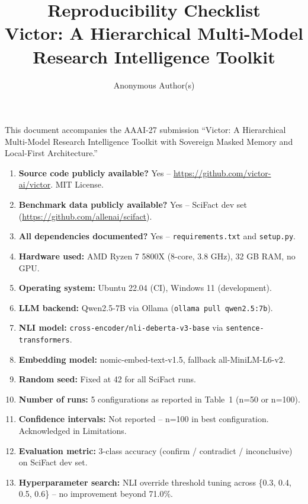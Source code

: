 \documentclass[letterpaper]{article}
\title{Reproducibility Checklist\\Victor: A Hierarchical Multi-Model Research Intelligence Toolkit}
\author{Anonymous Author(s)}
\begin{document}
\maketitle

This document accompanies the AAAI-27 submission ``Victor: A Hierarchical Multi-Model Research Intelligence Toolkit with Sovereign Masked Memory and Local-First Architecture.''

\begin{enumerate}
  \item \textbf{Source code publicly available?} Yes -- \url{https://github.com/victor-ai/victor}. MIT License.
  \item \textbf{Benchmark data publicly available?} Yes -- SciFact dev set (\url{https://github.com/allenai/scifact}).
  \item \textbf{All dependencies documented?} Yes -- \texttt{requirements.txt} and \texttt{setup.py}.
  \item \textbf{Hardware used:} AMD Ryzen 7 5800X (8-core, 3.8 GHz), 32 GB RAM, no GPU.
  \item \textbf{Operating system:} Ubuntu 22.04 (CI), Windows 11 (development).
  \item \textbf{LLM backend:} Qwen2.5-7B via Ollama (\texttt{ollama pull qwen2.5:7b}).
  \item \textbf{NLI model:} \texttt{cross-encoder/nli-deberta-v3-base} via \texttt{sentence-transformers}.
  \item \textbf{Embedding model:} nomic-embed-text-v1.5, fallback all-MiniLM-L6-v2.
  \item \textbf{Random seed:} Fixed at 42 for all SciFact runs.
  \item \textbf{Number of runs:} 5 configurations as reported in Table~1 (n=50 or n=100).
  \item \textbf{Confidence intervals:} Not reported -- n=100 in best configuration. Acknowledged in Limitations.
  \item \textbf{Evaluation metric:} 3-class accuracy (confirm / contradict / inconclusive) on SciFact dev set.
  \item \textbf{Hyperparameter search:} NLI override threshold tuning across \{0.3, 0.4, 0.5, 0.6\} -- no improvement beyond 71.0\%.
\end{enumerate}
\end{document}
